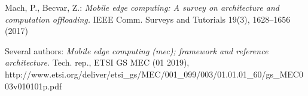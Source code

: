 \begin{thebibliography}{9}
        Mach, P., Becvar, Z.:
        \textit{Mobile edge computing: A survey on architecture and computation offloading.}
        IEEE Comm. Surveys and Tutorials 19(3), 1628–1656 (2017)

        Several authors:
        \textit{Mobile edge computing (mec); framework and reference architecture.}
        Tech. rep., ETSI GS MEC (01 2019), \\
        http://www.etsi.org/deliver/etsi\_gs/MEC/001\_099/003/01.01.01\_60/gs\_MEC003v010101p.pdf

\end{thebibliography}